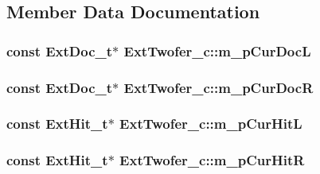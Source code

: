 \subsection{Member Data Documentation}
\hypertarget{classExtTwofer__c_a1848f0ce78a9ce16e3aeecef3524f8b7}{
\subsubsection[{m\-\_\-p\-Cur\-Doc\-L}]{\setlength{\rightskip}{0pt plus 5cm}const {\bf Ext\-Doc\-\_\-t}$\ast$ Ext\-Twofer\-\_\-c\-::m\-\_\-p\-Cur\-Doc\-L\hspace{0.3cm}{\ttfamily [protected]}}}\label{classExtTwofer__c_a1848f0ce78a9ce16e3aeecef3524f8b7}
\hypertarget{classExtTwofer__c_ac72f344c896f0d77f3afd00282dd7c07}{
\subsubsection[{m\-\_\-p\-Cur\-Doc\-R}]{\setlength{\rightskip}{0pt plus 5cm}const {\bf Ext\-Doc\-\_\-t}$\ast$ Ext\-Twofer\-\_\-c\-::m\-\_\-p\-Cur\-Doc\-R\hspace{0.3cm}{\ttfamily [protected]}}}\label{classExtTwofer__c_ac72f344c896f0d77f3afd00282dd7c07}
\hypertarget{classExtTwofer__c_aee742f3c38d38128f380748442b9b25f}{
\subsubsection[{m\-\_\-p\-Cur\-Hit\-L}]{\setlength{\rightskip}{0pt plus 5cm}const {\bf Ext\-Hit\-\_\-t}$\ast$ Ext\-Twofer\-\_\-c\-::m\-\_\-p\-Cur\-Hit\-L\hspace{0.3cm}{\ttfamily [protected]}}}\label{classExtTwofer__c_aee742f3c38d38128f380748442b9b25f}
\hypertarget{classExtTwofer__c_ae57e3440646961917a3f732f3b184028}{
\subsubsection[{m\-\_\-p\-Cur\-Hit\-R}]{\setlength{\rightskip}{0pt plus 5cm}const {\bf Ext\-Hit\-\_\-t}$\ast$ Ext\-Twofer\-\_\-c\-::m\-\_\-p\-Cur\-Hit\-R\hspace{0.3cm}{\ttfamily [protected]}}}\label{classExtTwofer__c_ae57e3440646961917a3f732f3b184028}
